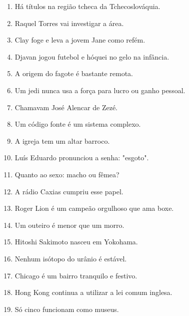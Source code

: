 \begin{enumerate}
\item H\'a t\'itulos na regi\~ao tcheca da Tchecoslov\'aquia.
\item Raquel Torres vai investigar a \'area.
\item Clay foge e leva a jovem Jane como ref\'em.
\item Djavan jogou futebol e h\'oquei no gelo na inf\^ancia.
\item A origem do fagote \'e bastante remota.
\item Um jedi nunca usa a for\c{c}a para lucro ou ganho pessoal.
\item Chamavam Jos\'e Alencar de Zez\'e.
\item Um c\'odigo fonte \'e um sistema complexo.
\item A igreja tem um altar barroco.
\item Lu\'is Eduardo pronunciou a senha: "esgoto".
\item Quanto ao sexo: macho ou f\^emea?
\item A r\'adio Caxias cumpriu esse papel.
\item Roger Lion \'e um campe\~ao orgulhoso que ama boxe.
\item Um outeiro \'e menor que um morro.
\item Hitoshi Sakimoto nasceu em Yokohama.
\item Nenhum is\'otopo do ur\^anio \'e est\'avel.
\item Chicago \'e um bairro tranquilo e festivo.
\item Hong Kong continua a utilizar a lei comum inglesa.
\item S\'o cinco funcionam como museus.
\end{enumerate}